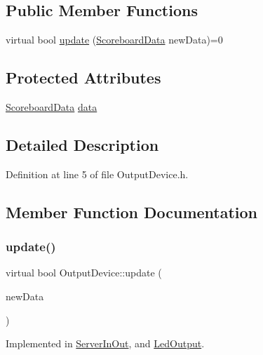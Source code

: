 \subsection*{Public Member Functions}
\begin{DoxyCompactItemize}
\item 
virtual bool \hyperlink{class_output_device_a9a5f6cf0655bd1c63639b593b10dbced}{update} (\hyperlink{struct_scoreboard_data}{Scoreboard\+Data} new\+Data)=0
\end{DoxyCompactItemize}
\subsection*{Protected Attributes}
\begin{DoxyCompactItemize}
\item 
\hyperlink{struct_scoreboard_data}{Scoreboard\+Data} \hyperlink{class_output_device_a72865c0b4546f1e80762d1bd53e2a065}{data}
\end{DoxyCompactItemize}


\subsection{Detailed Description}


Definition at line 5 of file Output\+Device.\+h.



\subsection{Member Function Documentation}
\mbox{\label{class_output_device_a9a5f6cf0655bd1c63639b593b10dbced}} 
\subsubsection{\texorpdfstring{update()}{update()}}
{\footnotesize\ttfamily virtual bool Output\+Device\+::update (\begin{DoxyParamCaption}\item[{\hyperlink{struct_scoreboard_data}{Scoreboard\+Data}}]{new\+Data }\end{DoxyParamCaption})\hspace{0.3cm}{\ttfamily [pure virtual]}}



Implemented in \hyperlink{class_server_in_out_a5442d5353fbf8445b7df75ee23c3322a}{Server\+In\+Out}, and \hyperlink{class_led_output_a553af18fe51a31ee3d5b94d9598503da}{Led\+Output}.



